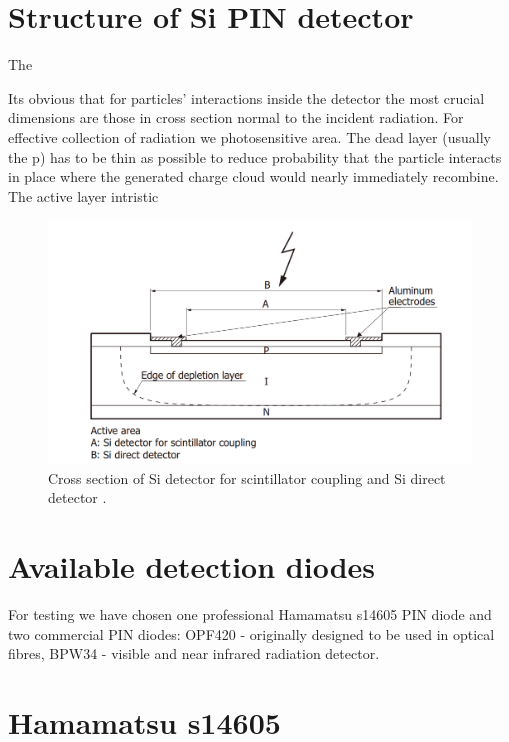 \section{Structure of Si PIN detector}
The 

Its obvious that for particles' interactions inside the detector the most crucial dimensions are those in cross section normal to the incident radiation. For effective collection of radiation we photosensitive area.
The dead layer (usually the p) has to be thin as possible to reduce probability that the particle interacts in place where the generated charge cloud would nearly immediately recombine. The active layer intristic 


\begin{figure}[H]
 \centering
 \includegraphics[scale=0.35, angle = 0]{./pictures/SiPINScheme.png}
 \caption{Cross section of Si detector for scintillator coupling and Si direct detector \cite{SiPINdirect}.}
 \label{SiPIN}
 
\end{figure}



\section{Available detection diodes}
For testing we have chosen one professional Hamamatsu s14605 PIN diode and two commercial PIN diodes: OPF420 - originally designed to be used in optical fibres, BPW34 - visible and near infrared radiation detector.  



\section{Hamamatsu s14605}


